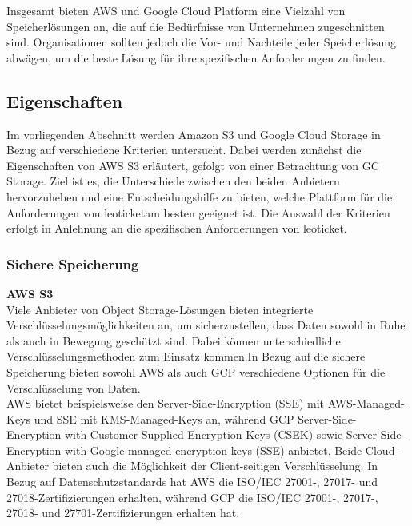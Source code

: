 Insgesamt bieten AWS und Google Cloud Platform eine Vielzahl von Speicherlösungen an, die auf die Bedürfnisse von Unternehmen zugeschnitten sind. Organisationen sollten jedoch die Vor- und Nachteile jeder Speicherlösung abwägen, um die beste Lösung für ihre spezifischen Anforderungen zu finden.

\newpage

\subsection{Eigenschaften}

Im vorliegenden Abschnitt werden Amazon S3 und Google Cloud Storage in Bezug auf verschiedene Kriterien untersucht. Dabei werden zunächst die Eigenschaften von AWS S3 erläutert, gefolgt von einer Betrachtung von GC Storage. Ziel ist es, die Unterschiede zwischen den beiden Anbietern hervorzuheben und eine Entscheidungshilfe zu bieten, welche Plattform für die Anforderungen von \glqq leoticket\grqq am besten geeignet ist. Die Auswahl der Kriterien erfolgt in Anlehnung an die spezifischen Anforderungen von \glqq leoticket\grqq.


\subsubsection{Sichere Speicherung}

\textbf{AWS S3}\\

Viele Anbieter von Object Storage-Lösungen bieten integrierte Verschlüsselungsmöglichkeiten an, um sicherzustellen, dass Daten sowohl in Ruhe als auch in Bewegung geschützt sind. Dabei können unterschiedliche Verschlüsselungsmethoden zum Einsatz kommen.In Bezug auf die sichere Speicherung bieten sowohl AWS als auch GCP verschiedene Optionen für die Verschlüsselung von Daten.\\



AWS bietet beispielsweise den Server-Side-Encryption (SSE) mit AWS-Managed-Keys und SSE mit KMS-Managed-Keys an, während GCP Server-Side-Encryption with Customer-Supplied Encryption Keys (CSEK) sowie Server-Side-Encryption with Google-managed encryption keys (SSE) anbietet. Beide Cloud-Anbieter bieten auch die Möglichkeit der Client-seitigen Verschlüsselung. In Bezug auf Datenschutzstandards hat AWS die ISO/IEC 27001-, 27017- und 27018-Zertifizierungen erhalten, während GCP die ISO/IEC 27001-, 27017-, 27018- und 27701-Zertifizierungen erhalten hat.


